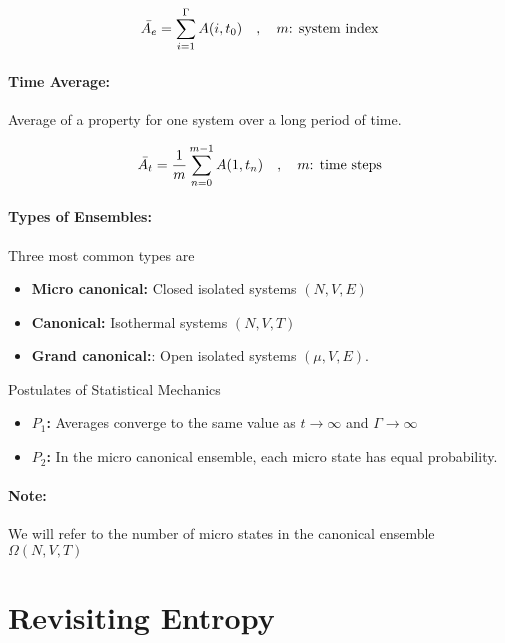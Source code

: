 \begin{equation}
    \Bar{A_e} = \sum_{i=1}^{\Gamma}A(i,t_0) \quad,\quad m\textrm{: system index}
\end{equation}
\newpage
\paragraph{Time Average:}Average of a property for one system over a long period of time.

\begin{equation}
    \Bar{A_t} = \frac{1}{m}\sum_{n=0}^{m-1}A(1,t_n) \quad,\quad m\textrm{: time steps}
\end{equation}

\paragraph{Types of Ensembles:} Three most common types are
\begin{itemize}
    \item \textbf{Micro canonical:} Closed isolated systems \quad $(N, V, E)$
    \item \textbf{Canonical:} Isothermal systems \quad $(N, V, T)$
    \item \textbf{Grand canonical:}: Open isolated systems \quad $(\mu, V, E)$.
\end{itemize}

\begin{law*}{Postulates of Statistical Mechanics}
\begin{itemize}
    \item \textbf{$P_1$:} Averages converge to the same value as $t\longrightarrow\infty$ and $\Gamma\longrightarrow\infty$
    \item \textbf{$P_2$:} In the micro canonical ensemble, each micro state has equal probability.
\end{itemize}
\end{law*}

\paragraph{Note:}We will refer to the number of micro states in the canonical ensemble $\Omega(N, V, T)$

\section{Revisiting Entropy}

